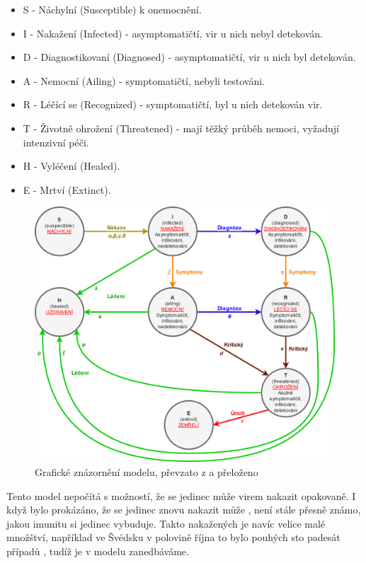 \documentclass[a4paper,11pt]{article}
\begin{document}
		\begin{itemize}
			\item S - Náchylní (Susceptible) k onemocnění.
			\item I - Nakažení (Infected) - asymptomatičtí, vir u nich nebyl detekován.
			\item D - Diagnostikovaní (Diagnosed) - asymptomatičtí, vir u nich byl detekován.
			\item A - Nemocní (Ailing) - symptomatičtí, nebyli testováni.
			\item R - Léčící se (Recognized) - symptomatičtí, byl u nich detekován vir.
			\item T - Životně ohrožení (Threatened) - mají těžký průběh nemoci, vyžadují intenzivní péči.
			\item H - Vyléčení (Healed).
			\item E - Mrtví (Extinct).
		\end{itemize}
	
		\begin{figure}[H]
			\caption{Grafické znázornění modelu, převzato z \cite{source} a přeloženo}
			\label{fig1}
			\centering
			\includegraphics[scale=0.25]{model.png}
		\end{figure}
	
		Tento model nepočítá s možností, že se jedinec může virem nakazit opakovaně. I když bylo prokázáno, že se jedinec znovu nakazit může \cite{reinfection}, není stále přesně známo, jakou imunitu si jedinec vybuduje. Takto nakažených je navíc velice malé množštví, například ve Švédsku v polovině října to bylo pouhých sto padesát případů \cite{reincases}, tudíž je v modelu zanedbáváme.
		
\end{document}
